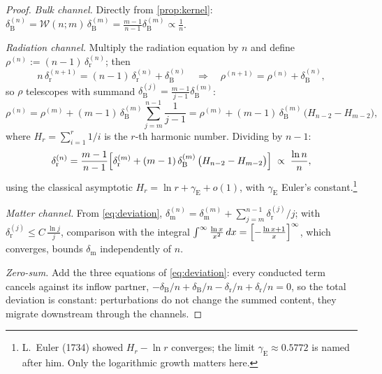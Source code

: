 \documentclass[11pt]{amsbook}
\theoremstyle{plain}
\theoremstyle{definition}
\theoremstyle{remark}
\begin{document}
\begin{proof}
\emph{Bulk channel.} Directly from \cref{prop:kernel}: $\delta_{\mathrm B}^{(n)} = \mathcal{W}(n; m)\,\delta_{\mathrm B}^{(m)} = \frac{m-1}{n-1}\delta_{\mathrm B}^{(m)} \propto \frac{1}{n}$.

\emph{Radiation channel.} Multiply the radiation equation by $n$ and define $\rho^{(n)} := (n-1)\,\delta_{\mathrm r}^{(n)}$; then
\begin{equation}\label{eq:rho}
n\,\delta_{\mathrm r}^{(n+1)} = (n-1)\,\delta_{\mathrm r}^{(n)} + \delta_{\mathrm B}^{(n)}
\quad\Longrightarrow\quad
\rho^{(n+1)} = \rho^{(n)} + \delta_{\mathrm B}^{(n)},
\end{equation}
so $\rho$ telescopes with summand $\delta_{\mathrm B}^{(j)} = \frac{m-1}{j-1}\delta_{\mathrm B}^{(m)}$:
\begin{equation}\label{eq:rhotelescope}
\rho^{(n)} = \rho^{(m)} + (m-1)\,\delta_{\mathrm B}^{(m)} \sum_{j = m}^{n-1} \frac{1}{j-1} = \rho^{(m)} + (m-1)\,\delta_{\mathrm B}^{(m)}\,\bigl( H_{n-2} - H_{m-2} \bigr),
\end{equation}
where $H_{r} = \sum_{i=1}^{r} 1/i$ is the $r$-th harmonic number. Dividing by $n - 1$:
\begin{equation}\label{eq:exactdr}
\delta_{\mathrm r}^{(n)} = \frac{m-1}{n-1}\Bigl[ \delta_{\mathrm r}^{(m)} + (m-1)\,\delta_{\mathrm B}^{(m)}\,\bigl(H_{n-2} - H_{m-2}\bigr) \Bigr] \;\propto\; \frac{\ln n}{n},
\end{equation}
using the classical asymptotic $H_{r} = \ln r + \gamma_{\mathrm{E}} + o(1)$, with $\gamma_{\mathrm{E}}$ Euler's constant.\footnote{L.~Euler (1734) showed $H_r - \ln r$ converges; the limit $\gamma_{\mathrm E} \approx 0.5772$ is named after him. Only the logarithmic growth matters here.}

\emph{Matter channel.} From \cref{eq:deviation}, $\delta_{\mathrm m}^{(n)} = \delta_{\mathrm m}^{(m)} + \sum_{j=m}^{n-1} \delta_{\mathrm r}^{(j)}/j$; with $\delta_{\mathrm r}^{(j)} \leq C\,\frac{\ln j}{j}$, comparison with the integral $\int^{\infty} \frac{\ln x}{x^{2}}\,dx = \Bigl[ -\frac{\ln x + 1}{x} \Bigr]^{\infty}$, which converges, bounds $\delta_{\mathrm m}$ independently of $n$.

\emph{Zero-sum.} Add the three equations of \cref{eq:deviation}: every conducted term cancels against its inflow partner, $-\delta_{\mathrm B}/n + \delta_{\mathrm B}/n - \delta_{\mathrm r}/n + \delta_{\mathrm r}/n = 0$, so the total deviation is constant: perturbations do not change the summed content, they migrate downstream through the channels.


\end{proof}
\end{document}
